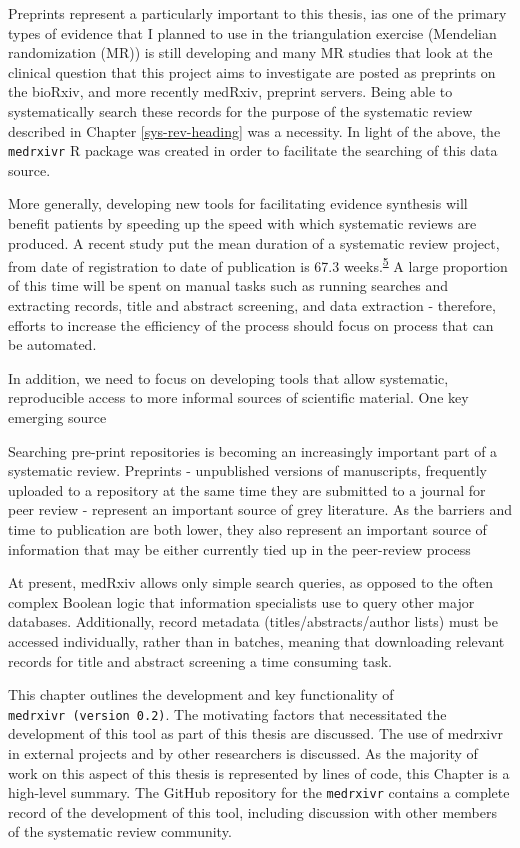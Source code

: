 \documentclass[a4paper, twoside]{templates/ociamthesis}
\begin{document}
Preprints represent a particularly important to this thesis, ias one of the primary types of evidence that I planned to use in the triangulation exercise (Mendelian randomization (MR)) is still developing and many MR studies that look at the clinical question that this project aims to investigate are posted as preprints on the bioRxiv, and more recently medRxiv, preprint servers. Being able to systematically search these records for the purpose of the systematic review described in Chapter \ref{sys-rev-heading} was a necessity. In light of the above, the \texttt{medrxivr} R package was created in order to facilitate the searching of this data source.

More generally, developing new tools for facilitating evidence synthesis will benefit patients by speeding up the speed with which systematic reviews are produced. A recent study put the mean duration of a systematic review project, from date of registration to date of publication is 67.3 weeks.\textsuperscript{\protect\hyperlink{ref-borah2017}{5}} A large proportion of this time will be spent on manual tasks such as running searches and extracting records, title and abstract screening, and data extraction - therefore, efforts to increase the efficiency of the process should focus on process that can be automated.

In addition, we need to focus on developing tools that allow systematic, reproducible access to more informal sources of scientific material. One key emerging source

Searching pre-print repositories is becoming an increasingly important part of a systematic review. Preprints - unpublished versions of manuscripts, frequently uploaded to a repository at the same time they are submitted to a journal for peer review - represent an important source of grey literature. As the barriers and time to publication are both lower, they also represent an important source of information that may be either currently tied up in the peer-review process

At present, medRxiv allows only simple search queries, as opposed to the often complex Boolean logic that information specialists use to query other major databases. Additionally, record metadata (titles/abstracts/author lists) must be accessed individually, rather than in batches, meaning that downloading relevant records for title and abstract screening a time consuming task.

This chapter outlines the development and key functionality of \texttt{medrxivr\ (version\ 0.2)}. The motivating factors that necessitated the development of this tool as part of this thesis are discussed. The use of medrxivr in external projects and by other researchers is discussed. As the majority of work on this aspect of this thesis is represented by lines of code, this Chapter is a high-level summary. The GitHub repository for the \texttt{medrxivr} contains a complete record of the development of this tool, including discussion with other members of the systematic review community.
\end{document}
